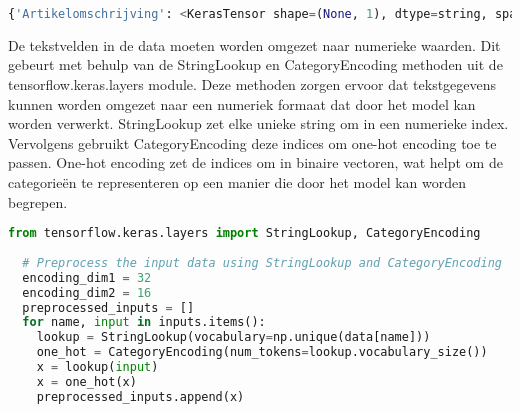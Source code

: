 \begin{lstlisting}[language=Python, caption={Output van de dictionary}]
  {'Artikelomschrijving': <KerasTensor shape=(None, 1), dtype=string, sparse=None, name=Artikelomschrijving>, 'Artikelomschrijving.1': <KerasTensor shape=(None, 1), dtype=string, sparse=None, name=Artikelomschrijving.1>, 'Voorts.gem.prijs': <KerasTensor shape=(None, 1), dtype=string, sparse=None, name=Voorts.gem.prijs>}
\end{lstlisting}

De tekstvelden in de data moeten worden omgezet naar numerieke waarden. Dit gebeurt met behulp van de StringLookup en CategoryEncoding methoden uit de tensorflow.keras.layers module. Deze methoden zorgen ervoor dat tekstgegevens kunnen worden omgezet naar een numeriek formaat dat door het model kan worden verwerkt. StringLookup zet elke unieke string om in een numerieke index. Vervolgens gebruikt CategoryEncoding deze indices om one-hot encoding toe te passen. One-hot encoding zet de indices om in binaire vectoren, wat helpt om de categorieën te representeren op een manier die door het model kan worden begrepen.
\begin{lstlisting}[language=Python, caption={Omzetten van tekstvelden naar numerieke waarden}]
  from tensorflow.keras.layers import StringLookup, CategoryEncoding
  
  # Preprocess the input data using StringLookup and CategoryEncoding
  encoding_dim1 = 32
  encoding_dim2 = 16
  preprocessed_inputs = []
  for name, input in inputs.items():
    lookup = StringLookup(vocabulary=np.unique(data[name]))
    one_hot = CategoryEncoding(num_tokens=lookup.vocabulary_size())
    x = lookup(input)
    x = one_hot(x)
    preprocessed_inputs.append(x)
\end{lstlisting}


\section{}%
\label{sec:AutoencoderModelPOC}

